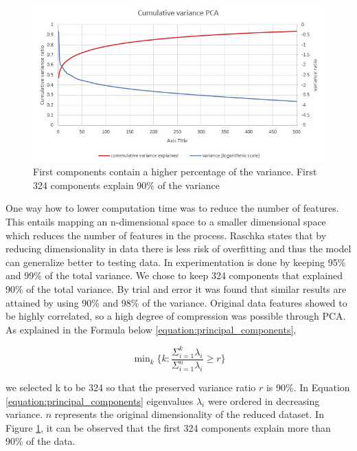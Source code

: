 \documentclass[12pt, a4paper]{report}
\theoremstyle{definition}
\theoremstyle{definition}%
\theoremstyle{definition}%
\theoremstyle{definition}%
\theoremstyle{definition}%
\theoremstyle{definition}%
\begin{document}
\begin{figure}[h]	
	\includegraphics[scale=0.8]{cumulative_variance_pca.jpg}
	\centering
	\caption[PCA first k components cumulative variance]{First components contain a higher percentage of the variance. First 324 components explain 90\% of the variance }
	\label{fig:cumulative_variance_pca}
\end{figure}

One way how to lower computation time was to reduce the number of features. This entails mapping an n-dimensional space to a smaller dimensional space which reduces the number of features in the process. Raschka  \cite{raschka2015python} states that by reducing dimensionality in data there is less risk of overfitting and thus the model can generalize better to testing data.  In \cite{Yang2004} experimentation is done by keeping 95\% and 99\% of the total variance. We chose to keep 324 components that explained 90\% of the total variance. By trial and error it was found that similar results are attained by using 90\% and 98\% of the variance. Original data features showed to be highly correlated, so a high degree of compression was possible through PCA. As explained in the Formula below \ref{equation:principal_components},


\begin{equation} \label{equation:principal_components}
 \mathop{\text{min}}_k \Bigg\{ k : \frac{{\Sigma }_{i=1}^{k} \lambda_i}{{\Sigma }_{i=1}^{n}\lambda_i} \geq r \Bigg\}
\end{equation}

we selected k to be 324 so that the preserved variance ratio $r$ is 90\%. In Equation \ref{equation:principal_components} eigenvalues $\lambda_i$ were ordered in decreasing variance. $n$ represents the original dimensionality of the reduced dataset. In Figure \ref{fig:cumulative_variance_pca}, it can be observed that the first 324 components explain more than 90\% of the data.
\end{document}
